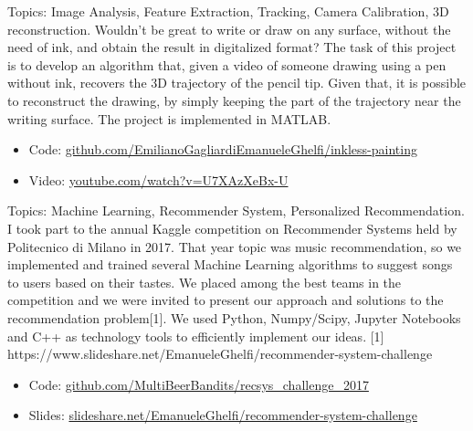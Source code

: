 \documentclass[11pt,a4paper,sans]{moderncv} %
\begin{document}
{
Topics: Image Analysis, Feature Extraction, Tracking, Camera Calibration, 3D reconstruction. \newline{}
Wouldn't be great to write or draw on any surface, without the need of ink, and obtain the result in digitalized format? The task of this project is to develop an algorithm that, given a video of someone drawing using a pen without ink, recovers the 3D trajectory of the pencil tip.
Given that, it is possible to reconstruct the drawing, by simply keeping the part of the trajectory near the writing surface. 
The project is implemented in MATLAB.
\begin{itemize}
	\item Code: \href{https://github.com/EmilianoGagliardiEmanueleGhelfi/inkless-painting}{github.com/EmilianoGagliardiEmanueleGhelfi/inkless-painting}
	\item Video: \href{https://www.youtube.com/watch?v=U7XAzXeBx-U}{youtube.com/watch?v=U7XAzXeBx-U}
\end{itemize}
}

{
Topics: Machine Learning, Recommender System, Personalized Recommendation.
\newline{}
I took part to the annual Kaggle competition on Recommender Systems held by Politecnico di Milano in 2017. That year topic was music recommendation, so we implemented and trained several Machine Learning algorithms to suggest songs to users based on their tastes.
\newline{}
We placed among the best teams in the competition and we were invited to present our approach and solutions to the recommendation problem[1].
\newline{}
We used Python, Numpy/Scipy, Jupyter Notebooks and C++ as technology tools to efficiently implement our ideas.
\newline{}
[1] https://www.slideshare.net/EmanueleGhelfi/recommender-system-challenge
\begin{itemize}
	\item Code: \href{https://github.com/MultiBeerBandits/recsys\_challenge\_2017}{github.com/MultiBeerBandits/recsys\_challenge\_2017}
	\item Slides: \href{https://www.slideshare.net/EmanueleGhelfi/recommender-system-challenge}{slideshare.net/EmanueleGhelfi/recommender-system-challenge}
\end{itemize}
}
\end{document}
